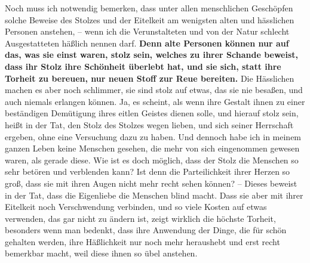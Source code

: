 Noch muss ich notwendig bemerken, dass unter allen menschlichen Geschöpfen solche
Beweise des Stolzes und der Eitelkeit am wenigsten  alten und hässlichen Personen
anstehen, -- wenn ich die Verunstalteten und von der Natur schlecht
Ausgestatteten häßlich nennen darf. \textbf{Denn alte Personen können nur auf
das, was
sie einst waren, stolz sein, welches zu ihrer Schande beweist, dass ihr Stolz
ihre Schönheit überlebt hat, und sie sich, statt ihre Torheit zu bereuen, nur
neuen Stoff zur Reue bereiten.} Die Hässlichen machen es aber noch schlimmer, sie
sind stolz auf etwas, das sie nie besaßen, und auch niemals erlangen können. Ja,
es scheint, als wenn ihre Gestalt ihnen zu einer beständigen Demütigung ihres
eitlen Geistes dienen solle, und hierauf stolz sein, heißt in der Tat, den
Stolz des Stolzes wegen lieben, und sich seiner Herrschaft ergeben, ohne eine
Versuchung dazu zu haben. Und dennoch habe ich in meinem ganzen Leben keine
Menschen gesehen, die mehr von sich eingenommen gewesen waren, als gerade diese.
Wie ist es doch möglich, dass der Stolz die Menschen so sehr betören und
verblenden kann? Ist denn die Parteilichkeit ihrer Herzen so groß, dass sie mit
ihren Augen nicht mehr recht sehen können? -- Dieses beweist in der Tat, dass
die Eigenliebe die Menschen blind macht. Dass sie aber mit ihrer Eitelkeit noch
Verschwendung verbinden, und so viele Kosten auf etwas verwenden, das gar nicht
zu ändern ist, zeigt wirklich die höchste Torheit, besonders wenn man bedenkt,
dass ihre Anwendung der Dinge, die für schön gehalten werden, ihre Häßlichkeit
nur noch mehr heraushebt und erst recht bemerkbar macht, weil diese ihnen so
übel anstehen.

\medskip

